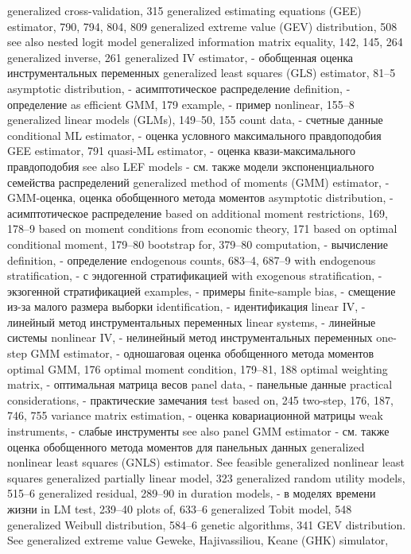 generalized cross-validation, 315
generalized estimating equations (GEE) estimator, 790, 794, 804, 809
generalized extreme value (GEV) distribution, 508 see also nested logit model
generalized information matrix equality, 142, 145, 264 generalized inverse, 261
generalized IV estimator, - обобщенная оценка инструментальных переменных
generalized least squares (GLS) estimator, 81–5
asymptotic distribution, - асимптотическое распределение 
definition, - определение
as efficient GMM, 179 
example, - пример
nonlinear, 155–8
generalized linear models (GLMs), 149–50, 155
count data, - счетные данные
conditional ML estimator, - оценка условного максимального правдоподобия 
GEE estimator, 791
quasi-ML estimator, - оценка квази-максимального правдоподобия 
see also LEF models - см. также модели экспоненциального семейства распределений
generalized method of moments (GMM) estimator, - GMM-оценка, оценка обобщенного метода моментов
asymptotic distribution, - асимптотическое распределение
based on additional moment restrictions, 169,
178–9
based on moment conditions from economic theory,
171
based on optimal conditional moment, 179–80 bootstrap for, 379–80
computation, - вычисление
definition, - определение
endogenous counts, 683–4, 687–9
with endogenous stratification, - с эндогенной стратификацией
with exogenous stratification, - экзогенной стратификацией
examples, - примеры
finite-sample bias, - смещение из-за малого размера выборки
identification, - идентификация
linear IV, - линейный метод инструментальных переменных
linear systems, - линейные системы
nonlinear IV, - нелинейный метод инструментальных переменных
one-step GMM estimator, - одношаговая оценка обобщенного метода моментов 
optimal GMM, 176
optimal moment condition, 179–81, 188 
optimal weighting matrix, - оптимальная матрица весов
panel data, - панельные данные
practical considerations, - практические замечания
test based on, 245
two-step, 176, 187, 746, 755
variance matrix estimation, - оценка ковариационной матрицы
weak instruments, - слабые инструменты
see also panel GMM estimator - см. также оценка обобщенного метода моментов для панельных данных
generalized nonlinear least squares (GNLS) estimator.
See feasible generalized nonlinear least squares generalized partially linear model, 323
generalized random utility models, 515–6 generalized residual, 289–90
in duration models, - в моделях времени жизни
in LM test, 239–40 plots of, 633–6
generalized Tobit model, 548
generalized Weibull distribution, 584–6
genetic algorithms, 341
GEV distribution. See generalized extreme value Geweke, Hajivassiliou, Keane (GHK) simulator,
